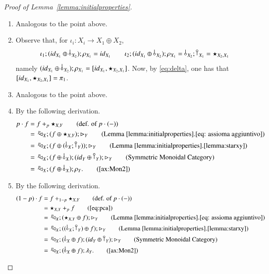 \begin{proof}[Proof of Lemma~\ref{lemma:initialproperties}]
\begin{enumerate}
Moreover
\begin{align*}
\iota_1^{X_1\oplus \zero} ; (\id{X_1}\oplus \cobang{X_2}) &= \iota_1^{X_1\oplus \zero} ; [\id{X_1}; \iota_{1},\cobang{X_2};\iota_2 ] \tag{def. of $\oplus$}\\
&=\id{X_1};\iota_1 \tag{coproduct}\\
&=\iota_1^{X_1\piu\zero}; \runit{X_1} ; \iota_1. \tag{def. of $\runit{}$} 
\end{align*}
Thus $ \id{X_1}\oplus \cobang{X_2}=\runit{X_1}; \iota_1$.
\item Analogous to the point above.
\item Observe that, for $\iota_i\colon X_i \to X_1\oplus X_2$, 
\[\iota_1 ; (\id{X_1}\oplus \bang{X_2});\runit{X_1}=\id{X_1} \qquad \iota_2 ;  (\id{X_1}\oplus \bang{X_2});\runit{X_1} = \bang{X_2}; \cobang{X_1}= \star_{X_2,X_1}\]
namely $(\id{X_1}\oplus \bang{X_2});\runit{X_1} = [\id{X_1}, \star_{X_2,X_1}]$. Now, by \eqref{eq:delta}, one has that $[{id}_{X_1}, \star_{X_2,X_1}]=\pi_1$.
\item Analogous to the point above.
\item By the following derivation.
\begin{align*}
p \cdot f &= f+_p\star_{X,Y} \tag{def. of $p\cdot(-)$}\\
&=\, \diagp{X} ; (f \oplus \star_{X,Y}) ; \codiag{Y} \tag{Lemma~\ref{lemma:initialproperties}.\ref{eq: assioma aggiuntivo}} \\ 
&=\, \diagp{X} ; (f \oplus (\bang{X};\cobang{Y})) ; \codiag{Y} \tag{Lemma \ref{lemma:initialproperties}.\ref{lemma:starxy}} \\ 
&=\, \diagp{X} ; (f \oplus \bang{X}) ;(\id{Y} \oplus \cobang{Y}) ; \codiag{Y} \tag{Symmetric Monoidal Category} \\ 
&=\, \diagp{X} ; (f \oplus \bang{X}) ;\runit{Y}. \tag{\ref{ax:Mon2}} \\ 
 \end{align*}
 \item By the following derivation.
\begin{align*}
(1-p) \cdot f &= f+_{1-p}\star_{X,Y} \tag{def. of $p\cdot(-)$}\\
&= \star_{X,Y} +_{p} f \tag{\ref{eq:pca}}\\
&=\, \diagp{X} ; (\star_{X,Y} \oplus f) ; \codiag{Y} \tag{Lemma~\ref{lemma:initialproperties}.\ref{eq: assioma aggiuntivo}} \\ 
&=\, \diagp{X} ; ((\bang{X};\cobang{Y}) \oplus f) ; \codiag{Y} \tag{Lemma \ref{lemma:initialproperties}.\ref{lemma:starxy}} \\ 
&=\, \diagp{X} ; (\bang{X} \oplus f) ;(\id{Y} \oplus \cobang{Y}) ; \codiag{Y} \tag{Symmetric Monoidal Category} \\ 
&=\, \diagp{X} ; ( \bang{X} \oplus f) ;\lunit{Y}. \tag{\ref{ax:Mon2}} \\ 
 \end{align*} 
 
\end{enumerate}
\end{proof}





